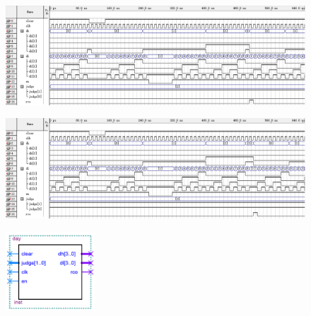 \documentclass[12pt]{article}
\begin{document}
\begin{figure}[hp]
	\centering  
	\includegraphics[width=\textwidth]{picture/fzday10.png} 
	\caption{}
	\label{fig:fzday3}   
\end{figure}
\begin{figure}[hp]
	\centering  
	\includegraphics[width=\textwidth]{picture/fzday11.png} 
	\caption{}
	\label{fig:fzday4}   
\end{figure}
\begin{figure}[hp]
	\centering  
	\includegraphics[width=0.3\textwidth]{picture/dayfz.png} 
	\caption{}
	\label{fig:fengzhuangday}   
\end{figure}
\end{document}
